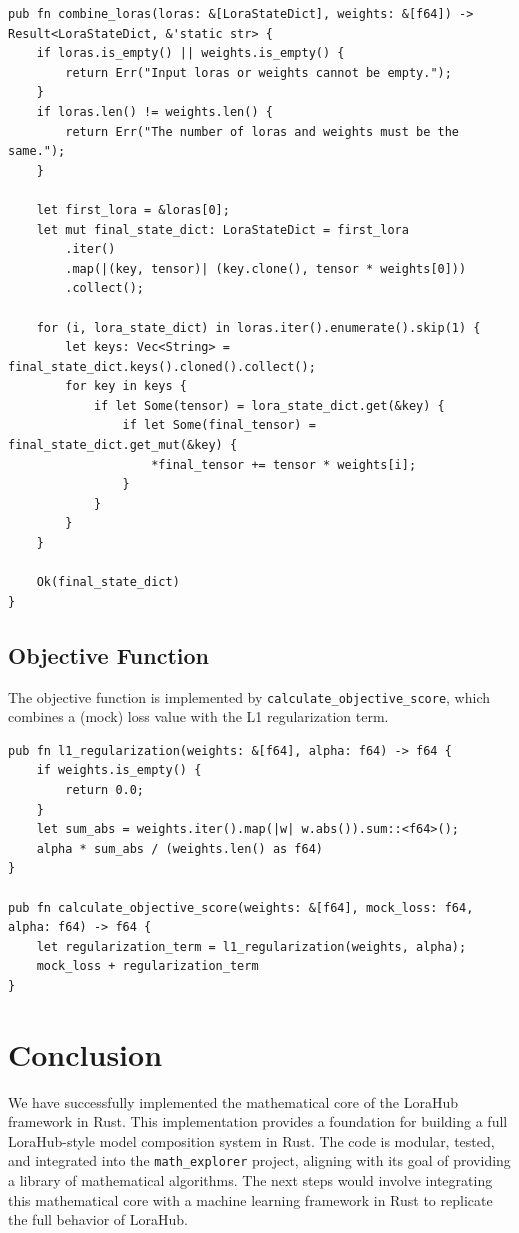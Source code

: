 \documentclass[12pt]{article}
\begin{document}
\begin{lstlisting}
pub fn combine_loras(loras: &[LoraStateDict], weights: &[f64]) -> Result<LoraStateDict, &'static str> {
    if loras.is_empty() || weights.is_empty() {
        return Err("Input loras or weights cannot be empty.");
    }
    if loras.len() != weights.len() {
        return Err("The number of loras and weights must be the same.");
    }

    let first_lora = &loras[0];
    let mut final_state_dict: LoraStateDict = first_lora
        .iter()
        .map(|(key, tensor)| (key.clone(), tensor * weights[0]))
        .collect();

    for (i, lora_state_dict) in loras.iter().enumerate().skip(1) {
        let keys: Vec<String> = final_state_dict.keys().cloned().collect();
        for key in keys {
            if let Some(tensor) = lora_state_dict.get(&key) {
                if let Some(final_tensor) = final_state_dict.get_mut(&key) {
                    *final_tensor += tensor * weights[i];
                }
            }
        }
    }

    Ok(final_state_dict)
}
\end{lstlisting}

\subsection{Objective Function}

The objective function is implemented by \texttt{calculate\_objective\_score}, which combines a (mock) loss value with the L1 regularization term.

\begin{lstlisting}
pub fn l1_regularization(weights: &[f64], alpha: f64) -> f64 {
    if weights.is_empty() {
        return 0.0;
    }
    let sum_abs = weights.iter().map(|w| w.abs()).sum::<f64>();
    alpha * sum_abs / (weights.len() as f64)
}

pub fn calculate_objective_score(weights: &[f64], mock_loss: f64, alpha: f64) -> f64 {
    let regularization_term = l1_regularization(weights, alpha);
    mock_loss + regularization_term
}
\end{lstlisting}

\section{Conclusion}

We have successfully implemented the mathematical core of the LoraHub framework in Rust. This implementation provides a foundation for building a full LoraHub-style model composition system in Rust. The code is modular, tested, and integrated into the \texttt{math\_explorer} project, aligning with its goal of providing a library of mathematical algorithms. The next steps would involve integrating this mathematical core with a machine learning framework in Rust to replicate the full behavior of LoraHub.



\end{document}
